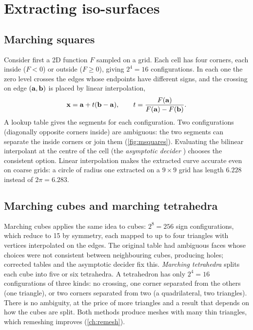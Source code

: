 \section{Extracting iso-surfaces}\label{sec:marching}

\subsection{Marching squares}

Consider first a 2D function $F$ sampled on a grid. Each cell has four corners, each inside
($F<0$) or outside ($F\ge0$), giving $2^4=16$ configurations. In each one the zero level crosses
the edges whose endpoints have different signs, and the crossing on edge $(\mathbf{a},\mathbf{b})$ is placed by
linear interpolation,
\begin{equation}
\mathbf{x}=\mathbf{a}+t(\mathbf{b}-\mathbf{a}),\qquad t=\frac{F(\mathbf{a})}{F(\mathbf{a})-F(\mathbf{b})} .
\end{equation}
A lookup table gives the segments for each configuration. Two configurations (diagonally
opposite corners inside) are ambiguous: the two segments can separate the inside corners or join
them (\cref{fig:msquares}). Evaluating the bilinear interpolant at the centre of the cell (the
\emph{asymptotic decider} \citep{Nielson1991}) chooses the consistent option. Linear
interpolation makes the extracted curve accurate even on coarse grids: a circle of radius one
extracted on a $9\times9$ grid has length $6.228$ instead of $2\pi=6.283$.


\subsection{Marching cubes and marching tetrahedra}

Marching cubes \citep{Lorensen1987} applies the same idea to cubes: $2^8=256$ sign
configurations, which reduce to 15 by symmetry, each mapped to up to four triangles with vertices
interpolated on the edges. The original table had ambiguous faces whose choices were not consistent
between neighbouring cubes, producing holes; corrected tables and the asymptotic decider fix this.
\emph{Marching tetrahedra} splits each cube into five or six tetrahedra. A tetrahedron has only
$2^4=16$ configurations of three kinds: no crossing, one corner separated from the others (one
triangle), or two corners separated from two (a quadrilateral, two triangles). There is no
ambiguity, at the price of more triangles and a result that depends on how the cubes are split.
Both methods produce meshes with many thin triangles, which remeshing improves (\cref{ch:remesh}).

